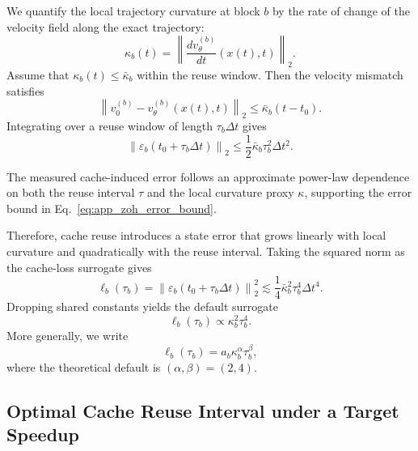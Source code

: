 We quantify the local trajectory curvature at block $b$ by the rate of
change of the velocity field along the exact trajectory:
\begin{equation}
    \kappa_b(t)
    =
    \left\|
    \frac{d v_\theta^{(b)}}{dt}(x(t),t)
    \right\|_2 .
    \label{eq:app_curvature_def}
\end{equation}
Assume that $\kappa_b(t)\le \bar{\kappa}_b$ within the reuse window. Then
the velocity mismatch satisfies
\begin{equation}
    \left\|
    v_0^{(b)}-v_\theta^{(b)}(x(t),t)
    \right\|_2
    \le
    \bar{\kappa}_b(t-t_0).
\end{equation}
Integrating over a reuse window of length $\tau_b\Delta t$ gives
\begin{equation}
    \left\|\varepsilon_b(t_0+\tau_b\Delta t)\right\|_2
    \le
    \frac{1}{2}
    \bar{\kappa}_b
    \tau_b^2
    \Delta t^2 .
    \label{eq:app_zoh_error_bound}
\end{equation}


The measured cache-induced error follows an approximate power-law dependence on both the reuse interval $\tau$ and the local curvature proxy $\kappa$, supporting the error bound in Eq.~\eqref{eq:app_zoh_error_bound}.

Therefore, cache reuse introduces a state error that grows linearly with
local curvature and quadratically with the reuse interval. Taking the
squared norm as the cache-loss surrogate gives
\begin{equation}
    \ell_b(\tau_b)
    =
     \left\|\varepsilon_b(t_0+\tau_b\Delta t)\right\|_2^2
    \lesssim
    \frac{1}{4}
    \bar{\kappa}_b^2
    \tau_b^4
    \Delta t^4 .
\end{equation}
Dropping shared constants yields the default surrogate
\begin{equation}
    \ell_b(\tau_b)
    \propto
    \kappa_b^2 \tau_b^4 .
    \label{eq:app_surrogate_default}
\end{equation}
More generally, we write
\begin{equation}
    \ell_b(\tau_b)
    =
    a_b
    \kappa_b^\alpha
    \tau_b^\beta ,
    \label{eq:app_general_surrogate}
\end{equation}
where the theoretical default is $(\alpha,\beta)=(2,4)$.
\subsection{Optimal Cache Reuse Interval under a Target Speedup}
\label{app:optimal_interval}

